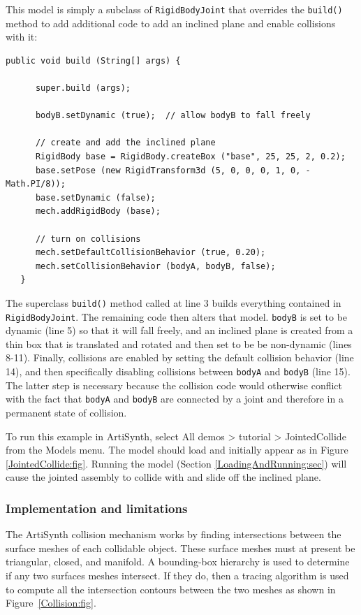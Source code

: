 This model is simply a subclass of {\tt RigidBodyJoint} that
overrides the {\tt build()} method to add additional code
to add an inclined plane and enable collisions with it:
%
\lstset{numbers=left}
\begin{lstlisting}[]
   public void build (String[] args) {

      super.build (args);

      bodyB.setDynamic (true);  // allow bodyB to fall freely

      // create and add the inclined plane
      RigidBody base = RigidBody.createBox ("base", 25, 25, 2, 0.2);
      base.setPose (new RigidTransform3d (5, 0, 0, 0, 1, 0, -Math.PI/8));
      base.setDynamic (false);
      mech.addRigidBody (base);

      // turn on collisions
      mech.setDefaultCollisionBehavior (true, 0.20);
      mech.setCollisionBehavior (bodyA, bodyB, false);
   }
\end{lstlisting}
\lstset{numbers=none}

The superclass {\tt build()} method called at line 3 builds everything
contained in {\tt RigidBodyJoint}. The remaining code then alters that
model. {\tt bodyB} is set to be dynamic (line 5) so that it will fall
freely, and an inclined plane is created from a thin box that is
translated and rotated and then set to be be non-dynamic (lines 8-11).
Finally, collisions are enabled by setting the default collision
behavior (line 14), and then specifically disabling collisions between
{\tt bodyA} and {\tt bodyB} (line 15). The latter step is necessary
because the collision code would otherwise conflict with the fact that
{\tt bodyA} and {\tt bodyB} are connected by a joint and therefore
in a permanent state of collision.

To run this example in ArtiSynth, select {\sf All demos > tutorial >
JointedCollide} from the {\sf Models} menu. The model should load and
initially appear as in Figure \ref{JointedCollide:fig}.  Running
the model (Section \ref{LoadingAndRunning:sec}) will
cause the jointed assembly to collide with and slide off the inclined
plane.

\subsubsection{Implementation and limitations}

The ArtiSynth collision mechanism works by finding intersections
between the surface meshes of each collidable object.  These surface
meshes must at present be triangular, closed, and manifold.
A bounding-box 
hierarchy is used to determine if any two surfaces meshes
intersect. If they do, then a tracing algorithm
is used to compute all the intersection contours
between the two meshes as shown in Figure~\ref{Collision:fig}.

